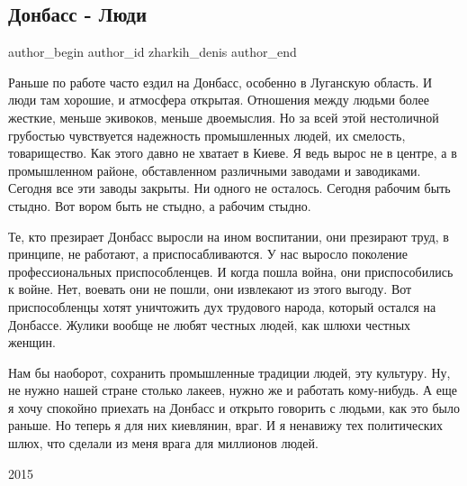  
 
 
 
 
 
\subsection{Донбасс - Люди}
\label{sec:01_11_2021.fb.zharkih_denis.1.donbass_ljudi}
 
\ifcmt
 author_begin
   author_id zharkih_denis
 author_end
\fi

Раньше по работе часто ездил на Донбасс, особенно в Луганскую область. И люди
там хорошие, и атмосфера открытая. Отношения между людьми более жесткие, меньше
экивоков, меньше двоемыслия. Но за всей этой нестоличной грубостью чувствуется
надежность промышленных людей, их смелость, товарищество. Как этого давно не
хватает в Киеве. Я ведь вырос не в центре, а в промышленном районе,
обставленном различными заводами и заводиками. Сегодня все эти заводы закрыты.
Ни одного не осталось. Сегодня рабочим быть стыдно. Вот вором быть не стыдно, а
рабочим стыдно. 

Те, кто презирает Донбасс выросли на ином воспитании, они презирают труд, в
принципе, не работают, а приспосабливаются. У нас выросло поколение
профессиональных приспособленцев. И когда пошла война, они приспособились к
войне. Нет, воевать они не пошли, они извлекают из этого выгоду. Вот
приспособленцы хотят уничтожить дух трудового народа, который остался на
Донбассе. Жулики вообще не любят честных людей, как шлюхи честных женщин. 

Нам бы наоборот, сохранить промышленные традиции людей, эту культуру. Ну, не
нужно нашей стране столько лакеев, нужно же и работать кому-нибудь. А еще я
хочу спокойно приехать на Донбасс и открыто говорить с людьми, как это было
раньше. Но теперь я для них киевлянин, враг. И я ненавижу тех политических
шлюх, что сделали из меня врага для миллионов людей.

2015

